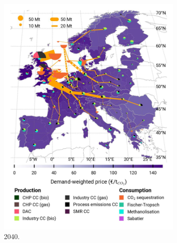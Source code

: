 \documentclass[preprint,12pt,sort&compress]{elsarticle}
\begin{document}
\begin{figure}[htbp]
\begin{subfigure}[t]{0.33\textwidth}
      \includegraphics[width=1\textwidth]{maps/pcipmi-national-international-expansion/base_s_adm___2040-balance_map_co2_stored} 
      \caption{ 2040.}
      \label{fig:PCI-in_lt_2040_co2}
  \end{subfigure}
  \begin{subfigure}[t]{0.33\textwidth}
      \vspace{0pt}

\end{subfigure}
\end{figure}
\end{document}
